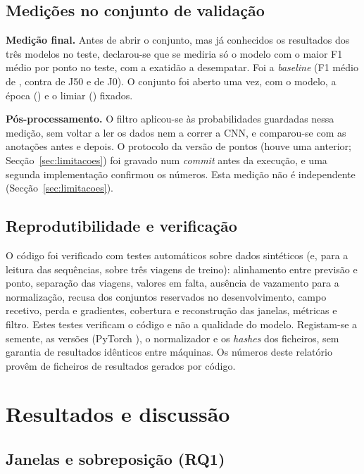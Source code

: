 \documentclass{article}
\begin{document}
\subsection{Medições no conjunto de validação}
\label{sec:medicoes}

\textbf{Medição final.} Antes de abrir o conjunto, mas já conhecidos os resultados dos três modelos no teste, declarou-se que se mediria só o modelo com o maior F1 médio por ponto no teste, com a exatidão a desempatar. Foi a \emph{baseline} (F1 médio de \resVaFMedioBs{}, contra \resVaFMedioJC{} de J50 e \resVaFMedioJZ{} de J0). O conjunto foi aberto uma vez, com o modelo, a época (\resVaEpoca{}) e o limiar (\resVaLimiar{}) fixados.

\textbf{Pós-processamento.} O filtro aplicou-se às probabilidades guardadas nessa medição, sem voltar a ler os dados nem a correr a CNN, e comparou-se com as anotações antes e depois. O protocolo da versão de \resPpJanela{} pontos (houve uma anterior; Secção~\ref{sec:limitacoes}) foi gravado num \emph{commit} antes da execução, e uma segunda implementação confirmou os números. Esta medição não é independente (Secção~\ref{sec:limitacoes}).

\subsection{Reprodutibilidade e verificação}

O código foi verificado com testes automáticos sobre dados sintéticos (e, para a leitura das sequências, sobre três viagens de treino): alinhamento entre previsão e ponto, separação das viagens, valores em falta, ausência de vazamento para a normalização, recusa dos conjuntos reservados no desenvolvimento, campo recetivo, perda e gradientes, cobertura e reconstrução das janelas, métricas e filtro. Estes testes verificam o código e não a qualidade do modelo. Registam-se a semente, as versões (PyTorch \resTrTorch{}), o normalizador e os \emph{hashes} dos ficheiros, sem garantia de resultados idênticos entre máquinas. Os números deste relatório provêm de ficheiros de resultados gerados por código.

\section{Resultados e discussão}
\label{sec:resultados}

\subsection{Janelas e sobreposição (RQ1)}
\label{sec:rq1}
\end{document}
